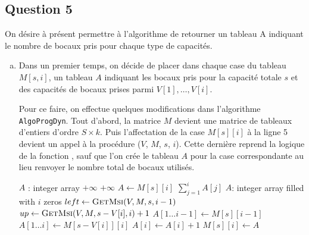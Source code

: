 \documentclass[12pt,a4paper]{article}
\begin{document}
\subsection*{Question 5}
On d\'esire \`a pr\'esent permettre \`a l'algorithme de retourner un tableau A indiquant le nombre de bocaux pris pour chaque type de capacit\'es.

\begin{enumerate}[a)]
 \item Dans un premier temps, on d\'ecide de placer dans chaque case du tableau $M[s,i]$, un tableau $A$ indiquant les bocaux pris pour la capacit\'e totale $s$ et des capacit\'es de bocaux prises parmi $V[1],\dotsc,V[i]$. 
 
 Pour ce faire, on effectue quelques modifications dans l'algorithme \texttt{AlgoProgDyn}. Tout d'abord, la matrice $M$ devient une matrice de tableaux d'entiers d'ordre $S \times k$.  Puis l'affectation de la case $M[s][i]$ \`a la ligne 5 devient un appel \`a la proc\'edure ($V$, $M$, $s$, $i$). Cette derni\`ere reprend la logique de la fonction , sauf que l'on cr\'ee le tableau $A$ pour la case correspondante au lieu renvoyer le nombre total de bocaux utilis\'es. 
 
 \begin{algorithm}
\begin{algorithmic}[1]
    \State $A$ : integer array
        \State {}
        \State \Return $+\infty$
        \State \Return $+\infty$
    \Else
        \State $A \gets M[s][i]$
        \State \Return $\sum_{j=1}^{i} A[j]$
    \EndIf
\EndFunction
\Statex
{}
    \State $A$: integer array filled with $i$ zeros
        \State $left \gets \Call{GetMsi}{V, M, s, i-1}$
        \State $up \gets \Call{GetMsi}{V, M, s-V[i], i}+1$
            \State $A[1\dotsc i-1] \gets M[s][i-1]$
        \Else
            \State $A[1\dotsc i] \gets M[s-V[i]][i]$
            \State $A[i] \gets A[i] + 1$
        \EndIf
    \EndIf
    \State $M[s][i] \gets A$
\EndFunction
\end{algorithmic}
\end{algorithm}
 
 
\end{enumerate}
\end{document}
